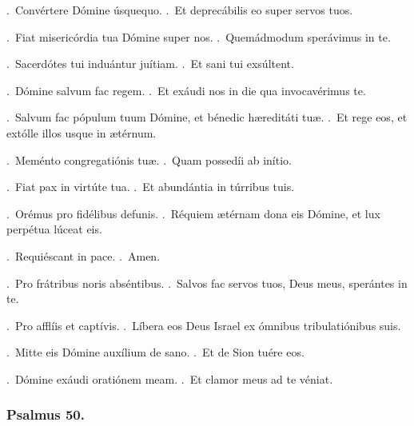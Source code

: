 \documentclass[12pt]{article} %
\newenvironment{response}{\leftskip 0in \setlength{\parindent}{0in}}{\vspace{2 mm}}
\let\oldgresixstar\gresixstar
\renewcommand{\gresixstar}{\textcolor{benred8}{\oldgresixstar}}
\let\oldVbar\Vbar
\renewcommand{\Vbar}{\textcolor{benred8}{\oldVbar .}}
\let\oldRbar\Rbar
\renewcommand{\Rbar}{\textcolor{benred8}{\oldRbar .}}
\begin{document}
\begin{response}
\Vbar\ Conv\'{e}rtere D\'{o}mine \'{u}squequo.
\Rbar\ Et deprec\'{a}bilis eo super servos tuos.

\Vbar\ Fiat miseric\'{o}rdia tua D\'{o}mine super nos.
\Rbar\ Quem\'{a}dmodum sper\'{a}vimus in te.

\Vbar\ Sacerd\'{o}tes tui indu\'{a}ntur ju\'{i}tiam.
\Rbar\ Et sani tui exs\'{u}ltent.

\Vbar\ D\'{o}mine salvum fac regem.
\Rbar\ Et ex\'{a}udi nos in die qua invocav\'{e}rimus te.

\Vbar\ Salvum fac p\'{o}pulum tuum D\'{o}mine, et b\'{e}nedic h\ae redit\'{a}ti tu\ae .
\Rbar\ Et rege eos, et ext\'{o}lle illos usque in \ae t\'{e}rnum.

\Vbar\ Mem\'{e}nto congregati\'{o}nis tu\ae .
\Rbar\ Quam possed\'{i}i ab in\'{i}tio.

\Vbar\ Fiat pax in virt\'{u}te tua. 
\Rbar\ Et abund\'{a}ntia in t\'{u}rribus tuis.

\Vbar\ Or\'{e}mus pro fid\'{e}libus defunis.
\Rbar\ R\'{e}quiem \ae t\'{e}rnam dona eis D\'{o}mine, et lux perp\'{e}tua l\'{u}ceat eis.

\Vbar\ Requi\'{e}scant in pace.
\Rbar\ Amen.

\Vbar\ Pro fr\'{a}tribus noris abs\'{e}ntibus.
\Rbar\ Salvos fac servos tuos, Deus meus, sper\'{a}ntes in te.

\Vbar\ Pro affl\'{i}is et capt\'{i}vis.
\Rbar\ L\'{i}bera eos Deus Israel ex \'{o}mnibus tribulati\'{o}nibus suis.

\Vbar\ Mitte eis D\'{o}mine aux\'{i}lium de sano.
\Rbar\ Et de Sion tu\'{e}re eos.

\Vbar\ D\'{o}mine ex\'{a}udi orati\'{o}nem meam.
\Rbar\ Et clamor meus ad te v\'{e}niat.

\end{response}

\subsubsection*{Psalmus 50.}



\end{document}
